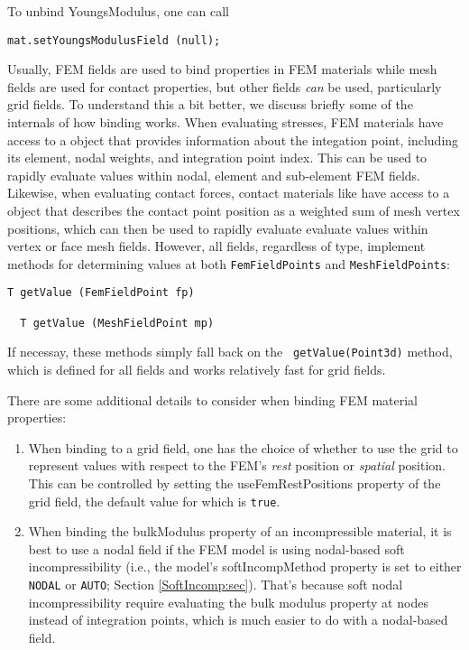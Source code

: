 To unbind {\sf YoungsModulus}, one can call
%
\begin{lstlisting}[]
   mat.setYoungsModulusField (null);
\end{lstlisting}
%

Usually, FEM fields are used to bind properties in FEM materials while
mesh fields are used for contact properties, but other fields {\it
can} be used, particularly grid fields. To understand this a bit
better, we discuss briefly some of the internals of how binding
works. When evaluating stresses, FEM materials have access to a
 object that
provides information about the integation point, including its
element, nodal weights, and integration point index. This can be used
to rapidly evaluate values within nodal, element and sub-element FEM
fields. Likewise, when evaluating contact forces, contact materials
like  have
access to a 
object that describes the contact point position as a weighted sum of
mesh vertex positions, which can then be used to rapidly evaluate
evaluate values within vertex or face mesh fields.  However, all
fields, regardless of type, implement methods for determining values
at both {\tt FemFieldPoints} and {\tt MeshFieldPoints}:
%
\begin{lstlisting}[]
  T getValue (FemFieldPoint fp)

  T getValue (MeshFieldPoint mp)
\end{lstlisting}
%
If necessay, these methods simply fall back on the {\tt
getValue(Point3d)} method, which is defined for all fields and works
relatively fast for grid fields.

There are some additional details to consider when binding FEM
material properties:

\begin{enumerate}

\item When binding to a grid field, one has the choice of whether to
use the grid to represent values with respect to the FEM's {\it rest}
position or {\it spatial} position. This can be controlled by setting
the {\sf useFemRestPositions} property of the grid field, the default
value for which is {\tt true}.

\item When binding the {\sf bulkModulus} property of an incompressible
material, it is best to use a nodal field if the FEM model is using
nodal-based soft incompressibility (i.e., the model's {\sf
softIncompMethod} property is set to either {\tt NODAL} or {\tt AUTO};
Section \ref{SoftIncomp:sec}). That's because soft nodal
incompressibility require evaluating the bulk modulus property at
nodes instead of integration points, which is much easier to do with a
nodal-based field.

\end{enumerate}

